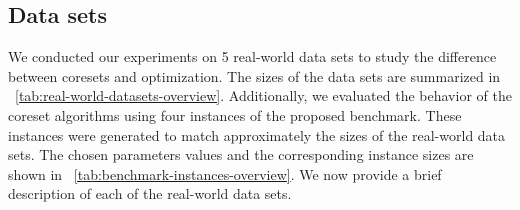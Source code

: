 


\subsection{Data sets}
We conducted our experiments on 5 real-world data sets to study the difference between coresets and optimization. 
The sizes of the data sets are summarized in ~\cref{tab:real-world-datasets-overview}. Additionally, we evaluated the behavior of the coreset algorithms using four instances of the proposed benchmark. These instances were generated to match approximately the sizes of the real-world data sets. The chosen parameters values and the corresponding instance sizes are shown in ~\cref{tab:benchmark-instances-overview}. 
We now provide a brief description of each of the real-world data sets.


